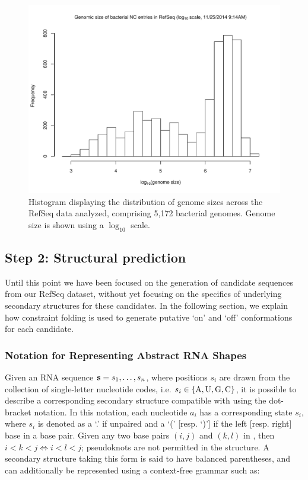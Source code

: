 \begin{figure}[!ht]
\centering
\includegraphics[width=.9\textwidth]{Figures/Ribofinder/refseqGenomeSizes.pdf}
\caption{Histogram displaying the distribution of genome sizes across the RefSeq
data analyzed, comprising 5,172 bacterial genomes. Genome size is shown using a
$\log_{10}$ scale.}
\label{fig:genomeSizes}
\end{figure}

\subsection{Step 2: Structural prediction}
\label{subsec:rfinder:strpred}

Until this point we have been focused on the generation of candidate sequences
from our RefSeq dataset, without yet focusing on the specifics of underlying
secondary structures for these candidates. In the following section, we explain
how constraint folding is used to generate putative `on' and `off' conformations
for each candidate.

\subsubsection{Notation for Representing Abstract RNA Shapes}
\label{subsubsec:rfinder:shapes}

Given an RNA sequence ${\bf s} = s_1,\dots,s_n$, where positions $s_i$ are drawn from the collection of single-letter nucleotide codes, i.e.
$s_i \in \{\text{A,\,U,\,G,\,C}\}$, it is possible to describe a corresponding
secondary structure \strS compatible with \seq using the dot-bracket notation.
In this notation, each nucleotide $a_i$ has a corresponding state $s_i$, where
$s_i$ is denoted as a `.' if unpaired and a `(' [resp. `)'] if the left [resp.
right] base in a base pair. Given any two base pairs $(i,j)$ and $(k,l)$ in \strS, then $i < k < j \iff i < l < j$; pseudoknots are not permitted in the structure. A secondary structure taking this form is said to have balanced parentheses, and can additionally be represented using a context-free grammar such as:

